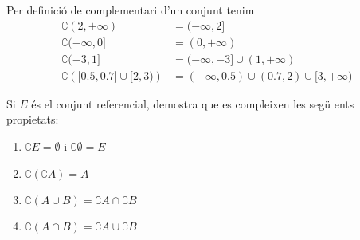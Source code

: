 \begin{solucio}
Per definici\'{o} de complementari d'un conjunt tenim%
\begin{align*}
\complement (2,+\infty )& =(-\infty ,2] \\
\complement (-\infty ,0]& =(0,+\infty ) \\
\complement (-3,1]& =(-\infty ,-3]\cup (1,+\infty ) \\
\complement \left( \lbrack 0.5,0.7]\cup \lbrack 2,3)\right) & =(-\infty
,0.5)\cup (0.7,2)\cup \lbrack 3,+\infty )
\end{align*}
\end{solucio}

\begin{exercici}
Si $E$ \'{e}s el conjunt referencial, demostra que es compleixen les seg\"{u}%
ents propietats:

\begin{enumerate}
\item $\complement E=\emptyset $ i $\complement \emptyset =E$

\item $\complement \left( \complement A\right) =A$

\item $\complement \left( A\cup B\right) =\complement A\cap \complement B$

\item $\complement \left( A\cap B\right) =\complement A\cup \complement B$
\end{enumerate}
\end{exercici}

